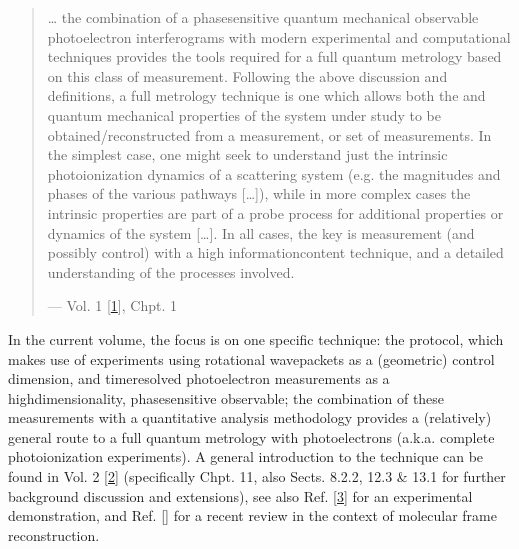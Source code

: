 \documentclass[letterpaper,table,10pt,english]{jupyterBook}
\begin{document}
\begin{quote}

\sphinxAtStartPar
… the combination of a phase\sphinxhyphen{}sensitive quantum mechanical observable \sphinxhyphen{} photoelectron interferograms \sphinxhyphen{} with modern experimental and computational techniques provides the tools required for a full quantum metrology based on this class of measurement. Following the above discussion and definitions, a full metrology technique is one which allows both the  and  quantum mechanical properties of the system under study to be obtained/reconstructed from a measurement, or set of measurements. In the simplest case, one might seek to understand just the intrinsic photoionization dynamics of a scattering system (e.g. the magnitudes and phases of the various pathways {[}…{]}), while in more complex cases the intrinsic properties are part of a probe process for additional properties or dynamics of the system {[}…{]}. In all cases, the key is measurement (and possibly control) with a high information\sphinxhyphen{}content technique, and a detailed understanding of the processes involved.

\begin{flushright}
--- Vol. 1 {[}\hyperlink{cite.backmatter/bibliography:id569}{1}{]}, Chpt. 1
\end{flushright}
\end{quote}

\sphinxAtStartPar
In the current volume, the focus is on one specific  technique: the  protocol, which makes use of experiments using rotational wavepackets as a (geometric) control dimension, and time\sphinxhyphen{}resolved photoelectron measurements as a high\sphinxhyphen{}dimensionality, phase\sphinxhyphen{}sensitive observable; the combination of these measurements with a quantitative analysis methodology provides a (relatively) general route to a full quantum metrology with photoelectrons (a.k.a. complete photoionization experiments). A general introduction to the technique can be found in  Vol. 2 {[}\hyperlink{cite.backmatter/bibliography:id570}{2}{]} (specifically Chpt. 11, also Sects. 8.2.2, 12.3 \& 13.1 for further background discussion and extensions), see also Ref. {[}\hyperlink{cite.backmatter/bibliography:id649}{3}{]} for an experimental demonstration, and Ref. {[}{]} for a recent review in the context of molecular frame reconstruction.
\end{document}
